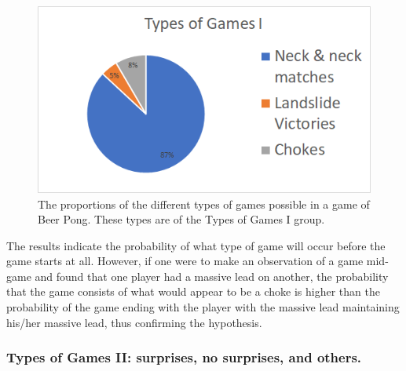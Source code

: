 \documentclass{article}
\begin{document}
\begin{figure}
	\centering
	\includegraphics[width=0.7\linewidth]{typesofgames1}
	\caption{The proportions of the different types of games possible in a game of Beer Pong. These types are of the Types of Games I group.}
	\label{typesofgames1}
\end{figure}

The results indicate the probability of what type of game will occur before the game starts at all. However, if one were to make an observation of a game mid-game and found that one player had a massive lead on another, the probability that the game consists of what would appear to be a choke is higher than the probability of the game ending with the player with the massive lead maintaining his/her massive lead, thus confirming the hypothesis.

\subsubsection{Types of Games II: surprises, no surprises, and others.}
\end{document}
